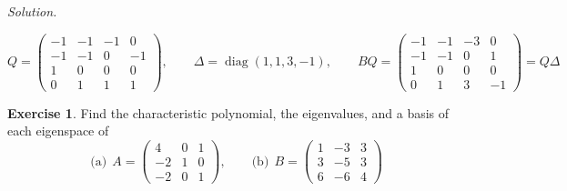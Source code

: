 \documentclass[12pt]{article}
\DeclareMathOperator{\diag}{diag}
\theoremstyle{definition}
\newtheorem{exercise}{Exercise}
\newenvironment{solution}{\par\noindent\textit{Solution.}\ }{\par\smallskip}
\begin{document}
\begin{solution}
\begin{itemize}
\[
Q=\begin{pmatrix}-1&-1&-1&0\\-1&-1&0&-1\\1&0&0&0\\0&1&1&1\end{pmatrix},\qquad\Delta=\diag(1,1,3,-1),\qquad
BQ=\begin{pmatrix}-1&-1&-3&0\\-1&-1&0&1\\1&0&0&0\\0&1&3&-1\end{pmatrix}=Q\Delta
\]
\end{itemize}
\end{solution}

\begin{exercise}\label{r7-ex-lang-eigen}
Find the characteristic polynomial, the eigenvalues, and a basis of each eigenspace of
\[
\text{(a)}\ \ A=\begin{pmatrix}4&0&1\\-2&1&0\\-2&0&1\end{pmatrix},\qquad
\text{(b)}\ \ B=\begin{pmatrix}1&-3&3\\3&-5&3\\6&-6&4\end{pmatrix}
\]
\end{exercise}
\end{document}
